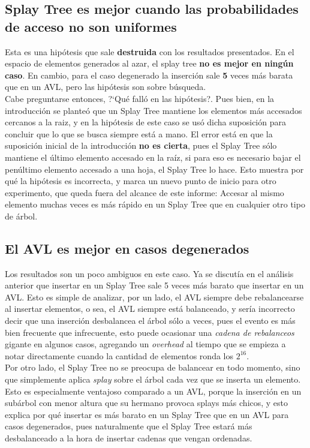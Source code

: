 \documentclass[12pt,letterpaper]{report}
\begin{document}
\subsection{Splay Tree es mejor cuando las probabilidades de acceso no son uniformes}
\label{subsec:analisis_splaytree}
Esta es una hipótesis que sale \textbf{destruida} con los resultados presentados. En el espacio de elementos generados al azar, el splay tree \textbf{no es mejor en ningún caso}. En cambio, para el caso degenerado la inserción sale \textbf{5} veces más barata que en un AVL, pero las hipótesis son sobre búsqueda.\\

Cabe preguntarse entonces, ?`Qué falló en las hipótesis?. Pues bien, en la introducción se planteó que un Splay Tree mantiene los elementos más accesados cercanos a la raiz, y en la hipótesis de este caso se usó dicha suposición para concluir que lo que se busca siempre está a mano. El error está en que la suposición inicial de la introducción \textbf{no es cierta}, pues el Splay Tree sólo mantiene el último elemento accesado en la raíz, si para eso es necesario bajar el penúltimo elemento accesado a una hoja, el Splay Tree lo hace. Esto muestra por qué la hipótesis es incorrecta, y marca un nuevo punto de inicio para otro experimento, que queda fuera del alcance de este informe: Accesar al mismo elemento muchas veces es más rápido en un Splay Tree que en cualquier otro tipo de árbol.

\subsection{El AVL es mejor en casos degenerados}
\label{subsec:analisis_avl_degenerado}
Los resultados son un poco ambiguos en este caso. Ya se discutía en el análisis anterior que insertar en un Splay Tree sale 5 veces más barato que insertar en un AVL. Esto es simple de analizar, por un lado, el AVL siempre debe rebalancearse al insertar elementos, o sea, el AVL siempre está balanceado, y sería incorrecto decir que una inserción desbalancea el árbol sólo a veces, pues el evento es más bien frecuente que infrecuente, esto puede ocasionar una \emph{cadena de rebalanceos} gigante en algunos casos, agregando un \emph{overhead} al tiempo que se empieza a notar directamente cuando la cantidad de elementos ronda los $2^{16}$.\\

Por otro lado, el Splay Tree no se preocupa de balancear en todo momento, sino que simplemente aplica \emph{splay} sobre el árbol cada vez que se inserta un elemento. Esto es especialmente ventajoso comparado a un AVL, porque la inserción en un subárbol con menor altura que su hermano provoca splays más chicos, y esto explica por qué insertar es más barato en un Splay Tree que en un AVL para casos degenerados, pues naturalmente que el Splay Tree estará más desbalanceado a la hora de insertar cadenas que vengan ordenadas.\\
\end{document}
